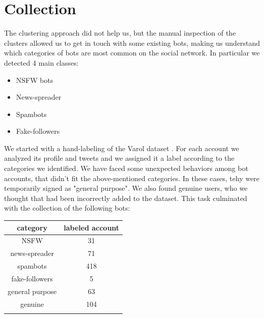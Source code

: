 \section{Collection}

The clustering approach did not help us, but the manual inspection of the clusters allowed us to get in touch with some existing bots, making us understand which categories of bots are most common on the social network. In particular we detected 4 main classes:
\begin{itemize}
	\item[\PencilRight]NSFW bots
	\item[\PencilRight]News-spreader
	\item[\PencilRight]Spambots
	\item[\PencilRight]Fake-followers
\end{itemize}

We started with a hand-labeling of the Varol dataset \cite{Varol}. For each account we analyzed its profile and tweets and we assigned it a label according to the categories we identified.  We have faced some unexpected behaviors among bot accounts, that didn't fit the above-mentioned categories. In these cases, tehy were temporarily signed as "general purpose".
We also found genuine users, who we thought that had been incorrectly added to the dataset.
This task culminated with the collection of the following bots:

\begin{center}
	\begin{tabular}{cc}
		\\category&labeled account\\
		\hline\hline
		NSFW&31\\
		news-spreader&71\\
		spambots&418\\
		fake-followers&5\\
		general purpose&63\\
		genuine&104\\\hline\\		
	\end{tabular}
\end{center}

